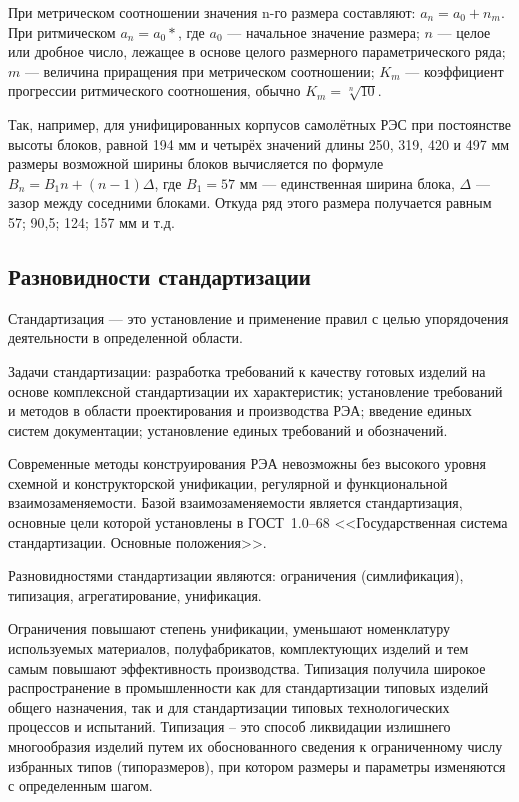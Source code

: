 \documentclass[unicode, 12pt, a4paper, oneside]{article}
\begin{document}
При метрическом соотношении значения n-го размера составляют: $ a_n=a_0+n_m $. При ритмическом $ a_n=a_0* $, где $ a_0 $ --- начальное значение размера; $ n $ --- целое или дробное число, лежащее в основе целого размерного параметрического ряда; $ m $ --- величина приращения при метрическом соотношении; $ K_m $ --- коэффициент прогрессии ритмического соотношения, обычно $ K_m = \sqrt[n]{10} $.

Так, например, для унифицированных корпусов самолётных РЭС при постоянстве высоты блоков, равной 194 мм и четырёх значений длины 250, 319, 420 и 497 мм размеры возможной ширины блоков вычисляется по формуле $ B_n = B_1n + (n-1)\Delta $, где $ B_1 = 57 $ мм --- единственная ширина блока, $ \Delta $ --- зазор между соседними блоками. Откуда ряд этого размера получается равным 57; 90,5; 124; 157 мм и т.д.

\subsection*{Разновидности стандартизации}

Стандартизация --- это установление и применение правил с целью упорядочения деятельности в определенной области.

Задачи стандартизации: разработка требований к качеству готовых изделий на основе комплексной стандартизации их характеристик; установление требований и методов в области проектирования и производства РЭА; введение единых систем документации; установление единых требований и обозначений.

Современные методы конструирования РЭА невозможны без высокого уровня схемной и конструкторской унификации, регулярной и функциональной взаимозаменяемости. Базой взаимозаменяемости является  стандартизация, основные цели которой установлены в ГОСТ~1.0–68  <<Государственная система стандартизации. Основные положения>>.

Разновидностями стандартизации являются: ограничения (симлификация), типизация, агрегатирование, унификация.

Ограничения повышают степень унификации, уменьшают номенклатуру используемых материалов, полуфабрикатов, комплектующих изделий и тем самым повышают эффективность производства.
Типизация получила широкое распространение в промышленности как для стандартизации типовых изделий общего назначения, так и для стандартизации типовых  технологических процессов и испытаний. Типизация – это способ ликвидации излишнего многообразия изделий путем их обоснованного сведения к ограниченному числу избранных типов (типоразмеров), при котором размеры и параметры изменяются с определенным шагом.
\end{document}

